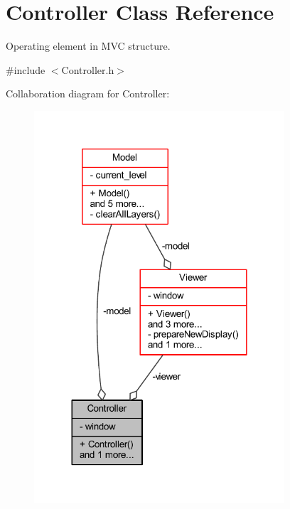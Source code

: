 \hypertarget{class_controller}{}\section{Controller Class Reference}
\label{class_controller}


Operating element in M\+VC structure.  




{\ttfamily \#include $<$Controller.\+h$>$}



Collaboration diagram for Controller\+:
\nopagebreak
\begin{figure}[H]
\begin{center}
\leavevmode
\includegraphics[width=264pt]{class_controller__coll__graph}
\end{center}
\end{figure}

